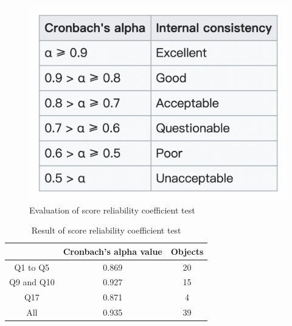 \begin{figure}[h]
  \includegraphics[width=0.5\linewidth]{Figure/Figure24.jpg}
  \centering
  \caption{Evaluation of score reliability coefficient test}
  \label{fig24}
\end{figure}


\begin{table}[h]
  \caption{Result of score reliability coefficient test}
  \label{table8}
  \centering
  \begin{tabular}{|c|c|c|}
  \hline
          & Cronbach's alpha value & Objects \\
 \hline 
  Q1 to Q5 & 0.869 & 20 \\
 \hline
  Q9 and Q10 & 0.927 & 15 \\
 \hline 
  Q17 & 0.871 & 4 \\
 \hline
  All & 0.935 & 39 \\
 \hline
  \end{tabular}
\end{table}

